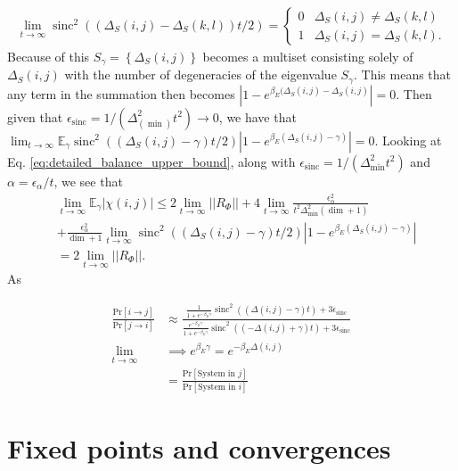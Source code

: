 \documentclass{article}
\newcommand{\abs}[1]{\left| #1 \right|}
\newcommand{\norm}[1]{\left| \left| #1 \right| \right|}
\newcommand{\set}[1]{\left\{ #1 \right\}}
\newcommand{\prob}[1]{\text{Pr}\left[ #1 \right]}
\DeclareMathOperator{\sinc}{sinc}
\begin{document}
\begin{align}
    \lim_{t \to \infty} \sinc^2((\Delta_S(i,j) - \Delta_S(k,l)) t/2) = \begin{cases}
        0 & \Delta_S(i,j) \neq \Delta_S(k,l) \\
        1 & \Delta_S(i,j) = \Delta_S(k,l).
    \end{cases}
\end{align}
Because of this $S_{\gamma} = \set{\Delta_S(i,j)}$ becomes a multiset consisting solely of $\Delta_S(i,j)$ with the number of degeneracies of the eigenvalue $S_{\gamma}$. This means that any term in the summation then becomes $\abs{1 - e^{\beta_E(\Delta_S(i,j) - \Delta_S(i,j)}} = 0$. Then given that $\epsilon_{\sinc} = 1/(\Delta_(\min)^2 t^2) \to 0$, we have that $\lim_{t \to \infty} \mathbb{E}_{\gamma} \sinc^2((\Delta_S(i,j) - \gamma)t/2) \abs{1 - e^{\beta_E(\Delta_S(i,j) - \gamma)}} = 0$. Looking at Eq. \eqref{eq:detailed_balance_upper_bound}, along with $\epsilon_{\sinc} = 1/(\Delta_{\min}^2 t^2)$ and $\alpha = \epsilon_{\alpha} / t$, we see that 
\begin{align}
    &\lim_{t \to \infty} \mathbb{E}_{\gamma} \abs{\chi(i,j)} \leq 2 \lim_{t \to \infty} \norm{R_{\Phi}} + 4 \lim_{t \to \infty} \frac{\epsilon_{\alpha}^2}{t^2 \Delta_{\min}^2 (\dim + 1)} \nonumber \\
    &+ \frac{\epsilon_{\alpha}^2}{\dim + 1} \lim_{t \to \infty} \sinc^2((\Delta_S(i,j) - \gamma)t/2) \abs{1 - e^{\beta_E(\Delta_S(i,j) - \gamma)}} \\
    &= 2 \lim_{t \to \infty} \norm{R_{\Phi}}.
\end{align}
As 

\begin{align}
    \frac{\prob{i \to j}}{\prob{j \to i}} &\approx \frac{\frac{1}{1 + e^{-\beta_E \gamma}}\sinc^2 ((\Delta(i,j) - \gamma)t)+ 3 \epsilon_{\sinc}}{\frac{e^{-\beta_E \gamma}}{1 + e^{-\beta_E \gamma}} \sinc^2((-\Delta(i,j) + \gamma)t) + 3 \epsilon_{\sinc}}  \nonumber \\
    \lim_{t \to \infty} &\implies e^{\beta_E \gamma} = e^{-\beta_E \Delta(i,j)} \nonumber \\
    &= \frac{\prob{\text{System in } j}}{ \prob{\text{System in } i}} \nonumber
\end{align}

\section{Fixed points and convergences}
\end{document}
